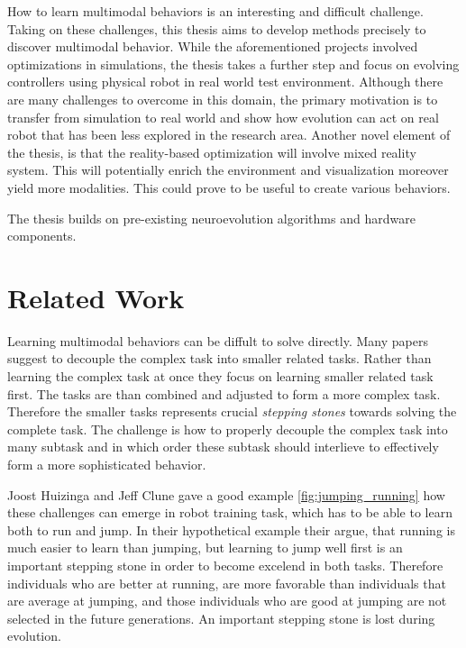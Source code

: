 \documentclass[format=acmsmall, review=false, screen=true]{acmart}
\begin{document}
How to learn multimodal behaviors is an interesting and difficult challenge. Taking on these challenges, this thesis aims to develop methods precisely to discover multimodal behavior. While the aforementioned projects involved optimizations in simulations, the thesis takes a further step and focus on evolving controllers using physical robot in real world test environment. Although there are many challenges to overcome in this domain, the primary motivation is to transfer from simulation to real world and show how evolution can act on real robot that has been less explored in the research area. Another novel element of the thesis, is that the reality-based optimization will involve mixed reality system. This will potentially enrich the environment and visualization moreover yield more modalities. This could prove to be useful to create various behaviors.


The thesis builds on pre-existing neuroevolution algorithms and hardware components.

\section{Related Work}

Learning multimodal behaviors can be diffult to solve directly. Many papers suggest to decouple the complex task into smaller related tasks. Rather than learning the complex task at once they focus on learning smaller related task first. The tasks are than combined and adjusted to form a more complex task. Therefore the smaller tasks represents crucial \emph{stepping stones} towards solving the complete task. The challenge is how to properly decouple the complex task into many subtask and in which order these subtask should interlieve to effectively form a more sophisticated behavior.

Joost Huizinga and Jeff Clune gave a good example \ref{fig:jumping_running} how these challenges can emerge in robot training task, which has to be able to learn both to run and jump. In their hypothetical example their argue, that running is much easier to learn than jumping, but learning to jump well first is an important stepping stone in order to become excelend in both tasks. Therefore individuals who are better at running, are more favorable than individuals that are average at jumping, and those individuals who are good at jumping are not selected in the future generations. An important stepping stone is lost during evolution. 
\end{document}

